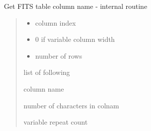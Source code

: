 \documentclass[letterpaper,10pt,english]{sphinxmanual}
\begin{document}
\begin{fulllineitems}
\label{\detokenize{qfits_functions:qfits.fitscolnam}}
Get FITS table column name - internal routine
\begin{quote}\begin{description}
\item[{Parameters}] \leavevmode\begin{itemize}
\item {} 
 \textendash{} column index

\item {} 
 \textendash{} 0 if variable column width

\item {} 
 \textendash{} number of rows

\end{itemize}

\item[{Returns}] \leavevmode

\begin{DUlineblock}{0em}
\item[] list of following
\item[]
\begin{DUlineblock}{\DUlineblockindent}
\item[]     column name
\item[]      number of characters in colnam
\item[]       variable repeat count
\end{DUlineblock}
\end{DUlineblock}


\end{description}\end{quote}

\end{fulllineitems}

\end{document}
